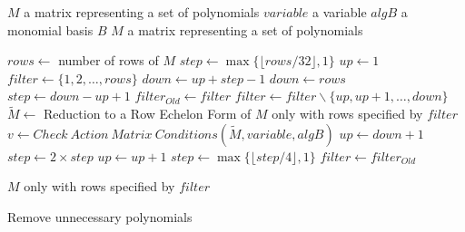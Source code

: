 \begin{algorithm}[!ht]
  \begin{algorithmic}[1]
    \Require
      \Statex $M$ a matrix representing a set of polynomials
      \Statex $variable$ a variable
      \Statex $algB$ a monomial basis $B$
    \Ensure
      \Statex $M$ a matrix representing a set of polynomials
      \Statex

      \State $rows \gets$ number of rows of $M$
      \State $step \gets \max\{\lfloor rows/32\rfloor, 1\}$ 
      \State $up \gets 1$
      \State $filter \gets \{1,2,\dots,rows\}$
        \State $down \gets up + step - 1$
          \State $down \gets rows$
	  \State $step \gets down - up + 1$
	\EndIf
	\State $filter_{Old} \gets filter$
	\State $filter \gets filter \backslash \{up, up+1, \dots, down\}$
	\State $\tilde{M} \gets$ Reduction to a Row Echelon Form of $M$ only with rows specified by $filter$
        \State $v \gets Check\ Action\ Matrix\ Conditions(\tilde{M}, variable, algB)$
          \State $up \gets down + 1$
	  \State $step \gets 2\times step$
	\Else
	    \State $up \gets up + 1$
	  \Else
            \State $step \gets \max\{\lfloor step/4\rfloor, 1\}$
	  \EndIf
	  \State $filter \gets filter_{Old}$
	\EndIf
      \EndWhile

      \State \Return $M$ only with rows specified by $filter$
  \end{algorithmic}
  \caption{Remove unnecessary polynomials}
  \label{alg:removeUn}
\end{algorithm}

